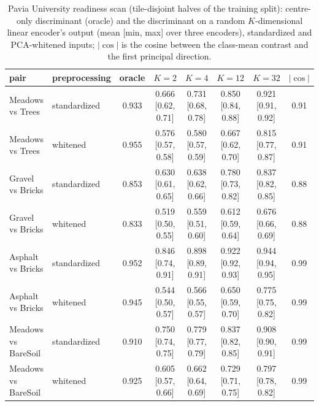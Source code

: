 \begin{table}[htbp]\centering\scriptsize
\caption{Pavia University readiness scan (tile-disjoint halves of the training split): centre-only discriminant (oracle) and the discriminant on a random $K$-dimensional linear encoder's output (mean [min, max] over three encoders), standardized and PCA-whitened inputs; $|\cos|$ is the cosine between the class-mean contrast and the first principal direction.}\label{tab:pavia_scan}
\begin{tabular}{llcccccc}\toprule
pair & preprocessing & oracle & $K=2$ & $K=4$ & $K=12$ & $K=32$ & $|\cos|$ \\ \midrule
Meadows vs Trees & standardized & 0.933 & 0.666 [0.62, 0.71] & 0.731 [0.68, 0.78] & 0.850 [0.84, 0.88] & 0.921 [0.91, 0.92] & 0.91 \\
Meadows vs Trees & whitened & 0.955 & 0.576 [0.57, 0.58] & 0.580 [0.57, 0.59] & 0.667 [0.62, 0.70] & 0.815 [0.77, 0.87] & 0.91 \\
Gravel vs Bricks & standardized & 0.853 & 0.630 [0.61, 0.65] & 0.638 [0.62, 0.66] & 0.780 [0.73, 0.82] & 0.837 [0.82, 0.85] & 0.88 \\
Gravel vs Bricks & whitened & 0.833 & 0.519 [0.50, 0.55] & 0.559 [0.51, 0.60] & 0.612 [0.59, 0.64] & 0.676 [0.66, 0.69] & 0.88 \\
Asphalt vs Bricks & standardized & 0.952 & 0.846 [0.74, 0.91] & 0.898 [0.89, 0.91] & 0.922 [0.92, 0.93] & 0.944 [0.94, 0.95] & 0.99 \\
Asphalt vs Bricks & whitened & 0.945 & 0.544 [0.50, 0.57] & 0.566 [0.55, 0.57] & 0.650 [0.59, 0.70] & 0.775 [0.75, 0.82] & 0.99 \\
Meadows vs BareSoil & standardized & 0.910 & 0.750 [0.74, 0.75] & 0.779 [0.77, 0.79] & 0.837 [0.82, 0.85] & 0.908 [0.90, 0.91] & 0.99 \\
Meadows vs BareSoil & whitened & 0.925 & 0.605 [0.57, 0.66] & 0.662 [0.64, 0.69] & 0.729 [0.71, 0.75] & 0.797 [0.78, 0.82] & 0.99 \\
\bottomrule\end{tabular}\end{table}
